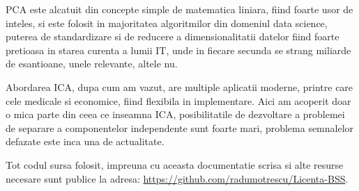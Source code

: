 \documentclass[12pt,oneside]{article}
\begin{document}
PCA este alcatuit din concepte simple de matematica liniara, fiind foarte usor de inteles, si este folosit in majoritatea algoritmilor din domeniul data science, puterea de standardizare si de reducere a dimensionalitatii datelor fiind foarte pretioasa in starea curenta a lumii IT, unde in fiecare secunda se strang miliarde de esantioane, unele relevante, altele nu. 

Abordarea ICA, dupa cum am vazut, are multiple aplicatii moderne, printre care cele medicale si economice, fiind flexibila in implementare. Aici am acoperit doar o mica parte din ceea ce inseamna ICA, posibilitatile de dezvoltare a problemei de separare a componentelor independente sunt foarte mari, problema semnalelor defazate este inca una de actualitate.  

Tot codul sursa folosit, impreuna cu aceasta documentatie scrisa si alte resurse necesare sunt publice la adresa: \url{https://github.com/radumotrescu/Licenta-BSS}.
\newpage


%

\end{document}
